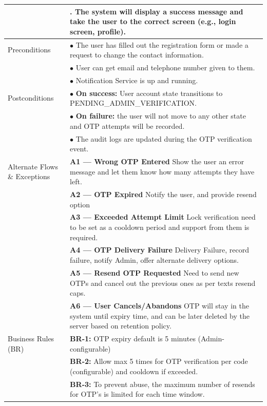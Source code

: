\begin{longtable}{|>{\raggedright\arraybackslash}p{4cm}|>{\raggedright\arraybackslash}p{11cm}|}
& 6. The system will display a success message and take the user to the correct screen (e.g., login screen, profile). \\
\hline
Preconditions & $\bullet$ The user has filled out the registration form or made a request to change the contact information. \\
& $\bullet$ User can get email and telephone number given to them. \\
& $\bullet$ Notification Service is up and running. \\
\hline
Postconditions & $\bullet$ \textbf{On success:} User account state transitions to PENDING\_ADMIN\_VERIFICATION. \\
& $\bullet$ \textbf{On failure:} the user will not move to any other state and OTP attempts will be recorded. \\
& $\bullet$ The audit logs are updated during the OTP verification event. \\
\hline
Alternate Flows \& Exceptions & \textbf{A1 — Wrong OTP Entered} \newline Show the user an error message and let them know how many attempts they have left. \\
& \textbf{A2 — OTP Expired} \newline Notify the user, and provide resend option \\
& \textbf{A3 — Exceeded Attempt Limit} \newline Lock verification need to be set as a cooldown period and support from them is required. \\
& \textbf{A4 — OTP Delivery Failure} \newline Delivery Failure, record failure, notify Admin, offer alternate delivery options. \\
& \textbf{A5 — Resend OTP Requested} \newline Need to send new OTPs and cancel out the previous ones as per texts resend caps. \\
& \textbf{A6 — User Cancels/Abandons} \newline OTP will stay in the system until expiry time, and can be later deleted by the server based on retention policy. \\
\hline
Business Rules (BR) & \textbf{BR-1:} OTP expiry default is 5 minutes (Admin-configurable) \\
& \textbf{BR-2:} Allow max 5 times for OTP verification per code (configurable) and cooldown if exceeded. \\
& \textbf{BR-3:} To prevent abuse, the maximum number of resends for OTP's is limited for each time window. \\

\end{longtable}
